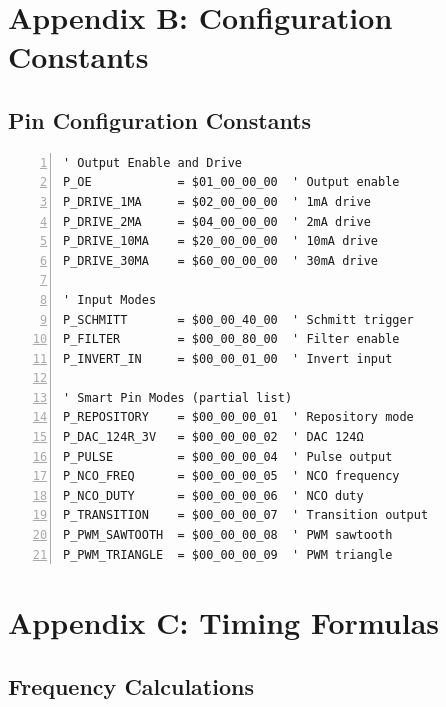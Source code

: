 \documentclass[11pt,a4paper,oneside,english]{book}
\begin{document}
\clearpage

\clearpage

\hypertarget{appendix-b-configuration-constants}{%
\chapter{Appendix B: Configuration
Constants}\label{appendix-b-configuration-constants}}

\hypertarget{pin-configuration-constants}{%
\section{Pin Configuration
Constants}\label{pin-configuration-constants}}

\begin{Spin2Block}
\begin{Verbatim}[numbers=left,numbersep=5pt,xleftmargin=15pt]
' Output Enable and Drive
P_OE            = $01_00_00_00  ' Output enable
P_DRIVE_1MA     = $02_00_00_00  ' 1mA drive
P_DRIVE_2MA     = $04_00_00_00  ' 2mA drive
P_DRIVE_10MA    = $20_00_00_00  ' 10mA drive
P_DRIVE_30MA    = $60_00_00_00  ' 30mA drive

' Input Modes
P_SCHMITT       = $00_00_40_00  ' Schmitt trigger
P_FILTER        = $00_00_80_00  ' Filter enable
P_INVERT_IN     = $00_00_01_00  ' Invert input

' Smart Pin Modes (partial list)
P_REPOSITORY    = $00_00_00_01  ' Repository mode
P_DAC_124R_3V   = $00_00_00_02  ' DAC 124Ω
P_PULSE         = $00_00_00_04  ' Pulse output
P_NCO_FREQ      = $00_00_00_05  ' NCO frequency
P_NCO_DUTY      = $00_00_00_06  ' NCO duty
P_TRANSITION    = $00_00_00_07  ' Transition output
P_PWM_SAWTOOTH  = $00_00_00_08  ' PWM sawtooth
P_PWM_TRIANGLE  = $00_00_00_09  ' PWM triangle
\end{Verbatim}
\end{Spin2Block}

\clearpage

\clearpage

\hypertarget{appendix-c-timing-formulas}{%
\chapter{Appendix C: Timing Formulas}\label{appendix-c-timing-formulas}}

\hypertarget{frequency-calculations}{%
\section{Frequency Calculations}\label{frequency-calculations}}
\end{document}

